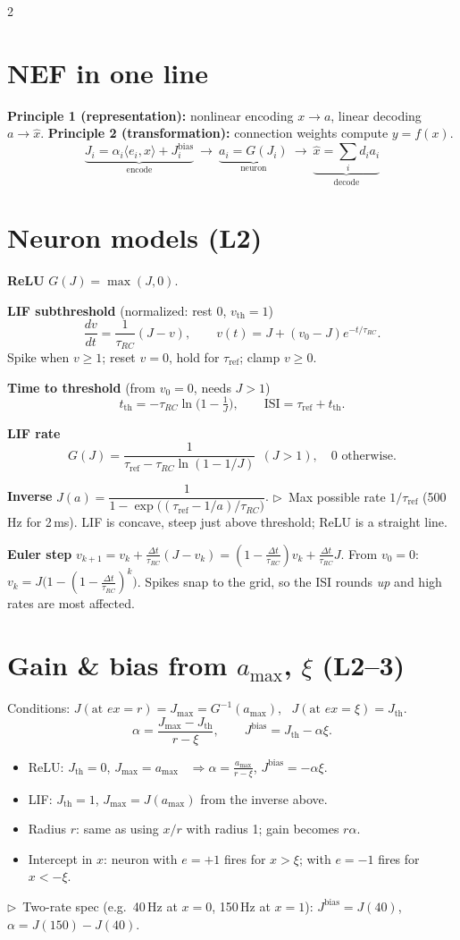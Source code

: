\documentclass[9pt,letterpaper]{extarticle}
\newcommand{\sub}[1]{\par\vspace{2pt}\textbf{#1}\quad}
\newcommand{\tip}[1]{{\color{BrickRed}\small$\triangleright$~#1}}
\newcommand{\Jb}{J^{\mathrm{bias}}}
\newcommand{\tref}{\tau_{\mathrm{ref}}}
\newcommand{\trc}{\tau_{RC}}
\begin{document}
\begin{multicols}{2}

\section{NEF in one line}
\textbf{Principle 1 (representation):} nonlinear encoding $x \to a$, linear decoding $a \to \hat x$.
\textbf{Principle 2 (transformation):} connection weights compute $y = f(x)$.
\[
\underbrace{J_i = \alpha_i\langle e_i, x\rangle + \Jb_i}_{\text{encode}}\ \to\ \underbrace{a_i = G(J_i)}_{\text{neuron}}\ \to\ \underbrace{\hat x = \textstyle\sum_i d_i a_i}_{\text{decode}}
\]

\section{Neuron models (L2)}
\sub{ReLU} $G(J) = \max(J, 0)$.
\sub{LIF subthreshold} (normalized: rest 0, $v_{\mathrm{th}} = 1$)
\[
\frac{dv}{dt} = \frac{1}{\trc}(J - v),\qquad v(t) = J + (v_0 - J)e^{-t/\trc}.
\]
Spike when $v \ge 1$; reset $v = 0$, hold for $\tref$; clamp $v \ge 0$.
\sub{Time to threshold} (from $v_0 = 0$, needs $J > 1$)
\[
t_{\mathrm{th}} = -\trc\ln\!\big(1 - \tfrac1J\big),\qquad \text{ISI} = \tref + t_{\mathrm{th}}.
\]
\sub{LIF rate}
\[
G(J) = \frac{1}{\tref - \trc\ln(1 - 1/J)}\ \ (J > 1),\quad 0 \text{ otherwise.}
\]
\sub{Inverse} $J(a) = \dfrac{1}{1 - \exp\!\big((\tref - 1/a)/\trc\big)}$.
\tip{Max possible rate $1/\tref$ (500\,Hz for 2\,ms). LIF is concave, steep just above threshold; ReLU is a straight line.}

\sub{Euler step} $v_{k+1} = v_k + \frac{\Delta t}{\trc}(J - v_k) = (1 - \tfrac{\Delta t}{\trc})v_k + \tfrac{\Delta t}{\trc}J$. From $v_0 = 0$: $v_k = J\big(1 - (1 - \tfrac{\Delta t}{\trc})^k\big)$. Spikes snap to the grid, so the ISI rounds \emph{up} and high rates are most affected.

\section{Gain \& bias from $a_{\max}$, $\xi$ (L2--3)}
Conditions: $J(\text{at } ex = r) = J_{\max} = G^{-1}(a_{\max})$, \ $J(\text{at } ex = \xi) = J_{\mathrm{th}}$.
\[
\alpha = \frac{J_{\max} - J_{\mathrm{th}}}{r - \xi},\qquad \Jb = J_{\mathrm{th}} - \alpha\xi.
\]
\begin{itemize}
\item ReLU: $J_{\mathrm{th}} = 0$, $J_{\max} = a_{\max}$ \ $\Rightarrow \alpha = \frac{a_{\max}}{r - \xi}$, $\Jb = -\alpha\xi$.
\item LIF: $J_{\mathrm{th}} = 1$, $J_{\max} = J(a_{\max})$ from the inverse above.
\item Radius $r$: same as using $x/r$ with radius 1; gain becomes $r\alpha$.
\item Intercept in $x$: neuron with $e = +1$ fires for $x > \xi$; with $e = -1$ fires for $x < -\xi$.
\end{itemize}
\tip{Two-rate spec (e.g.\ 40\,Hz at $x=0$, 150\,Hz at $x=1$): $\Jb = J(40)$, $\alpha = J(150) - J(40)$.}


\end{multicols}
\end{document}
